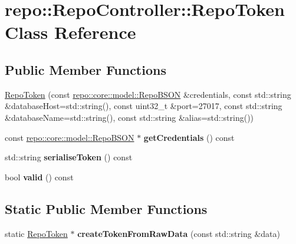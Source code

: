 \hypertarget{class_repo_controller_1_1_repo_token}{}\section{repo\+:\+:Repo\+Controller\+:\+:Repo\+Token Class Reference}
\label{class_repo_controller_1_1_repo_token}
\subsection*{Public Member Functions}
\begin{DoxyCompactItemize}
\item 
\hyperlink{class_repo_controller_1_1_repo_token_aac82fca24641c47a9fe522d41db9db4d}{Repo\+Token} (const \hyperlink{classrepo_1_1core_1_1model_1_1_repo_b_s_o_n}{repo\+::core\+::model\+::\+Repo\+B\+S\+O\+N} \&credentials, const std\+::string \&database\+Host=std\+::string(), const uint32\+\_\+t \&port=27017, const std\+::string \&database\+Name=std\+::string(), const std\+::string \&alias=std\+::string())
\item 
\hypertarget{class_repo_controller_1_1_repo_token_a331874c28bfcac72c95323b2a2d3760a}{}const \hyperlink{classrepo_1_1core_1_1model_1_1_repo_b_s_o_n}{repo\+::core\+::model\+::\+Repo\+B\+S\+O\+N} $\ast$ {\bfseries get\+Credentials} () const \label{class_repo_controller_1_1_repo_token_a331874c28bfcac72c95323b2a2d3760a}

\item 
\hypertarget{class_repo_controller_1_1_repo_token_a289049417912d6db439951d5fac6fd7e}{}std\+::string {\bfseries serialise\+Token} () const \label{class_repo_controller_1_1_repo_token_a289049417912d6db439951d5fac6fd7e}

\item 
\hypertarget{class_repo_controller_1_1_repo_token_a9df931d056ce2aedf72ea9a6e98e2160}{}bool {\bfseries valid} () const \label{class_repo_controller_1_1_repo_token_a9df931d056ce2aedf72ea9a6e98e2160}

\end{DoxyCompactItemize}
\subsection*{Static Public Member Functions}
\begin{DoxyCompactItemize}
\item 
\hypertarget{class_repo_controller_1_1_repo_token_a42f3e02e7486d4d984bd3189caafc06c}{}static \hyperlink{class_repo_controller_1_1_repo_token}{Repo\+Token} $\ast$ {\bfseries create\+Token\+From\+Raw\+Data} (const std\+::string \&data)\label{class_repo_controller_1_1_repo_token_a42f3e02e7486d4d984bd3189caafc06c}

\end{DoxyCompactItemize}
